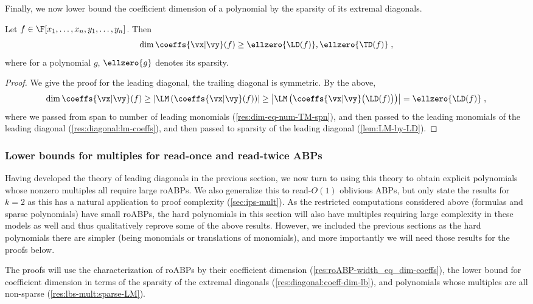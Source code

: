 \documentclass[11pt]{article}
\numberwithin{equation}{section}
\theoremstyle{definition}
\theoremstyle{plain}
\begin{document}
Finally, we now lower bound the coefficient dimension of a polynomial by the sparsity of its extremal diagonals.

\begin{corollarywp}\label{res:diagonal:coeff-dim-lb}
        Let $f\in\F[x_1,\ldots,x_n,y_1,\ldots,y_n]$.  Then
        \[
                \dim\coeffs{\vx|\vy}(f)\ge \ellzero{\LD(f)},\ellzero{\TD(f)}
                \;,
        \]
        where for a polynomial $g$, $\ellzero{g}$ denotes its sparsity.
\end{corollarywp}
\begin{proof}
        We give the proof for the leading diagonal, the trailing diagonal is symmetric.  By the above,
        \[
                \dim\coeffs{\vx|\vy}(f)
                \ge \left|\LM\left(\coeffs{\vx|\vy}(f)\right)\right|
                \ge \left|\LM\left(\coeffs{\vx|\vy}\big(\LD(f)\big)\right)\right|
                =  \ellzero{\LD(f)}
                \;,
        \]
        where we passed from span to number of leading monomials (\autoref{res:dim-eq-num-TM-spn}), and then passed to the leading monomials of the leading diagonal (\autoref{res:diagonal:lm-coeffs}), and then passed to sparsity of the leading diagonal (\autoref{lem:LM-by-LD}).
\end{proof}

\subsubsection{Lower bounds for multiples for read-once and read-twice ABPs}

Having developed the theory of leading diagonals in the previous section, we now turn to using this theory to obtain explicit polynomials whose nonzero multiples all require large roABPs. We also generalize this to read-$O(1)$ oblivious ABPs, but only state the results for $k=2$ as this has a natural application to proof complexity (\autoref{sec:ips-mult}).  As the restricted computations considered above (\sumpowsum formulas and sparse polynomials) have small roABPs, the hard polynomials in this section will also have multiples requiring large complexity in these models as well and thus qualitatively reprove some of the above results. However, we included the previous sections as the hard polynomials there are simpler (being monomials or translations of monomials), and more importantly we will need those results for the proofs below.

The proofs will use the characterization of roABPs by their coefficient dimension (\autoref{res:roABP-width_eq_dim-coeffs}), the lower bound for coefficient dimension in terms of the sparsity of the extremal diagonals (\autoref{res:diagonal:coeff-dim-lb}), and polynomials whose multiples are all non-sparse (\autoref{res:lbs-mult:sparse-LM}).
\end{document}
